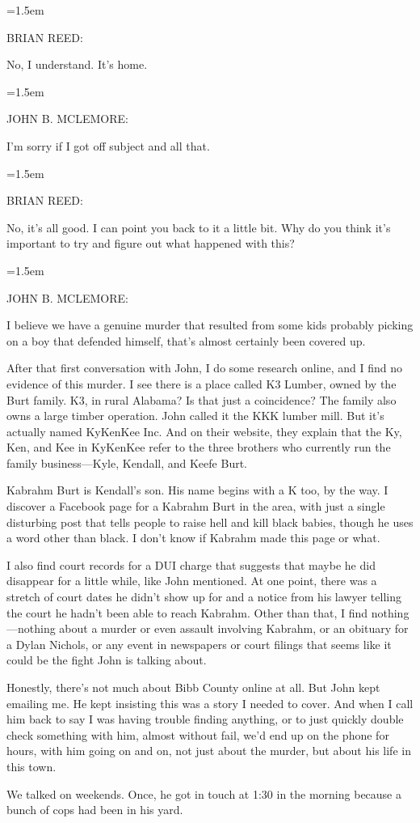 \documentclass[10pt,a4paper]{article}
\newcommand{\speakerlabel}[1]{{\plantin\color{speakerblue}\MakeUppercase{#1}:}}
\newenvironment{speech}[1]{%
		\par\medskip
		\begin{list}{}{%
			\leftmargin=1.5em
			\rightmargin=0pt
			\topsep=0pt
			\partopsep=0pt
			\parsep=0.5\baselineskip
			\itemsep=0pt}%
		\item\speakerlabel{#1}\enspace\ignorespaces
	}{\end{list}}
\newenvironment{narration}[1]{%
		\par\medskip\noindent\speakerlabel{#1}\enspace\ignorespaces
	}{\par\medskip}
\begin{document}
\begin{speech}{BRIAN REED}
No, I understand. It's home.
\end{speech}
\begin{speech}{JOHN B. McLEMORE}
I'm sorry if I got off subject and all that.
\end{speech}
\begin{speech}{BRIAN REED}
No, it's all good. I can point you back to it a little bit. Why do you think it's important to try and figure out what happened with this?
\end{speech}
\begin{speech}{JOHN B. McLEMORE}
I believe we have a genuine murder that resulted from some kids probably picking on a boy that defended himself, that's almost certainly been covered up.
\end{speech}
\begin{narration}{BRIAN REED}
After that first conversation with John, I do some research online, and I find no evidence of this murder. I see there is a place called K3 Lumber, owned by the Burt family. K3, in rural Alabama? Is that just a coincidence? The family also owns a large timber operation. John called it the KKK lumber mill. But it's actually named KyKenKee Inc. And on their website, they explain that the Ky, Ken, and Kee in KyKenKee refer to the three brothers who currently run the family business—Kyle, Kendall, and Keefe Burt.

Kabrahm Burt is Kendall's son. His name begins with a K too, by the way. I discover a Facebook page for a Kabrahm Burt in the area, with just a single disturbing post that tells people to raise hell and kill black babies, though he uses a word other than black. I don't know if Kabrahm made this page or what.

I also find court records for a DUI charge that suggests that maybe he did disappear for a little while, like John mentioned. At one point, there was a stretch of court dates he didn't show up for and a notice from his lawyer telling the court he hadn't been able to reach Kabrahm. Other than that, I find nothing—nothing about a murder or even assault involving Kabrahm, or an obituary for a Dylan Nichols, or any event in newspapers or court filings that seems like it could be the fight John is talking about.

Honestly, there's not much about Bibb County online at all. But John kept emailing me. He kept insisting this was a story I needed to cover. And when I call him back to say I was having trouble finding anything, or to just quickly double check something with him, almost without fail, we'd end up on the phone for hours, with him going on and on, not just about the murder, but about his life in this town.

We talked on weekends. Once, he got in touch at 1:30 in the morning because a bunch of cops had been in his yard.
\end{narration}
\end{document}
